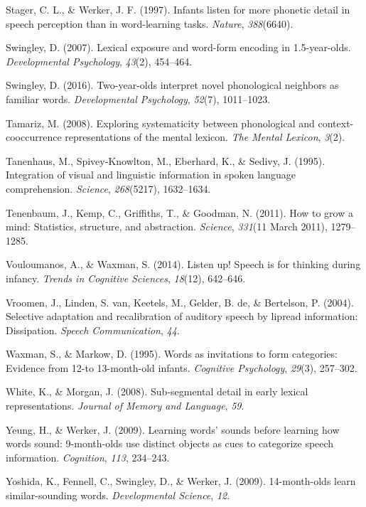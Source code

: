\documentclass[english,floatsintext,man]{apa6}
\theoremstyle{definition}
\theoremstyle{definition}
\theoremstyle{definition}
\theoremstyle{remark}
\begin{document}
\hypertarget{ref-stager1997}{}
Stager, C. L., \& Werker, J. F. (1997). Infants listen for more phonetic
detail in speech perception than in word-learning tasks. \emph{Nature},
\emph{388}(6640).

\hypertarget{ref-Swingley2007}{}
Swingley, D. (2007). Lexical exposure and word-form encoding in
1.5-year-olds. \emph{Developmental Psychology}, \emph{43}(2), 454--464.

\hypertarget{ref-Swingley2016}{}
Swingley, D. (2016). Two-year-olds interpret novel phonological
neighbors as familiar words. \emph{Developmental Psychology},
\emph{52}(7), 1011--1023.

\hypertarget{ref-Tamariz2008}{}
Tamariz, M. (2008). Exploring systematicity between phonological and
context-cooccurrence representations of the mental lexicon. \emph{The
Mental Lexicon}, \emph{3}(2).

\hypertarget{ref-Tanenhaus1995}{}
Tanenhaus, M., Spivey-Knowlton, M., Eberhard, K., \& Sedivy, J. (1995).
Integration of visual and linguistic information in spoken language
comprehension. \emph{Science}, \emph{268}(5217), 1632--1634.

\hypertarget{ref-tenenbaum11}{}
Tenenbaum, J., Kemp, C., Griffiths, T., \& Goodman, N. (2011). How to
grow a mind: Statistics, structure, and abstraction. \emph{Science},
\emph{331}(11 March 2011), 1279--1285.

\hypertarget{ref-vouloumanos2014}{}
Vouloumanos, A., \& Waxman, S. (2014). Listen up! Speech is for thinking
during infancy. \emph{Trends in Cognitive Sciences}, \emph{18}(12),
642--646.

\hypertarget{ref-vroomen2004}{}
Vroomen, J., Linden, S. van, Keetels, M., Gelder, B. de, \& Bertelson,
P. (2004). Selective adaptation and recalibration of auditory speech by
lipread information: Dissipation. \emph{Speech Communication},
\emph{44}.

\hypertarget{ref-waxman1995}{}
Waxman, S., \& Markow, D. (1995). Words as invitations to form
categories: Evidence from 12-to 13-month-old infants. \emph{Cognitive
Psychology}, \emph{29}(3), 257--302.

\hypertarget{ref-white2008b}{}
White, K., \& Morgan, J. (2008). Sub-segmental detail in early lexical
representations. \emph{Journal of Memory and Language}, \emph{59}.

\hypertarget{ref-yeung09}{}
Yeung, H., \& Werker, J. (2009). Learning words' sounds before learning
how words sound: 9-month-olds use distinct objects as cues to categorize
speech information. \emph{Cognition}, \emph{113}, 234--243.

\hypertarget{ref-yoshida2009}{}
Yoshida, K., Fennell, C., Swingley, D., \& Werker, J. (2009).
14-month-olds learn similar-sounding words. \emph{Developmental
Science}, \emph{12}.
\end{document}
